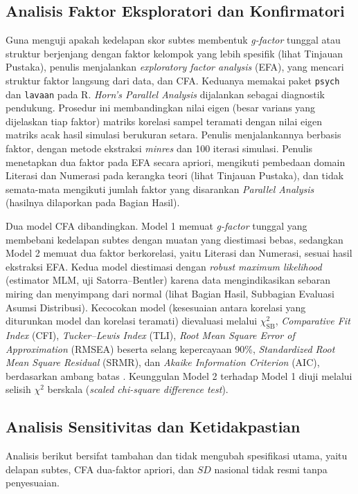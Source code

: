 \subsection{Analisis Faktor Eksploratori dan Konfirmatori}
Guna menguji apakah kedelapan skor subtes membentuk \textit{g-factor} tunggal atau struktur berjenjang dengan faktor kelompok yang lebih spesifik (lihat Tinjauan Pustaka), penulis menjalankan \textit{exploratory factor analysis} (EFA), yang mencari struktur faktor langsung dari data, dan CFA. Keduanya memakai paket \texttt{psych} \autocite{revelle2024psych} dan \texttt{lavaan} \autocite{rosseel2012lavaan} pada R. \textit{Horn's Parallel Analysis} \autocite{horn1965} dijalankan sebagai diagnostik pendukung. Prosedur ini membandingkan nilai eigen (besar varians yang dijelaskan tiap faktor) matriks korelasi sampel teramati dengan nilai eigen matriks acak hasil simulasi berukuran setara. Penulis menjalankannya berbasis faktor, dengan metode ekstraksi \textit{minres} dan 100 iterasi simulasi. Penulis menetapkan dua faktor pada EFA secara apriori, mengikuti pembedaan domain Literasi dan Numerasi pada kerangka teori (lihat Tinjauan Pustaka), dan tidak semata-mata mengikuti jumlah faktor yang disarankan \textit{Parallel Analysis} (hasilnya dilaporkan pada Bagian Hasil).

Dua model CFA dibandingkan. Model 1 memuat \textit{g-factor} tunggal yang membebani kedelapan subtes dengan muatan yang diestimasi bebas, sedangkan Model 2 memuat dua faktor berkorelasi, yaitu Literasi dan Numerasi, sesuai hasil ekstraksi EFA. Kedua model diestimasi dengan \textit{robust maximum likelihood} (estimator MLM, uji Satorra--Bentler) karena data mengindikasikan sebaran miring dan menyimpang dari normal (lihat Bagian Hasil, Subbagian Evaluasi Asumsi Distribusi). Kecocokan model (kesesuaian antara korelasi yang diturunkan model dan korelasi teramati) dievaluasi melalui $\chi^2_{\text{SB}}$, \textit{Comparative Fit Index} (CFI), \textit{Tucker--Lewis Index} (TLI), \textit{Root Mean Square Error of Approximation} (RMSEA) beserta selang kepercayaan 90\%, \textit{Standardized Root Mean Square Residual} (SRMR), dan \textit{Akaike Information Criterion} (AIC), berdasarkan ambang batas \textcite{hubentler1999}. Keunggulan Model 2 terhadap Model 1 diuji melalui selisih $\chi^2$ berskala (\textit{scaled chi-square difference test}).

\subsection{Analisis Sensitivitas dan Ketidakpastian}
Analisis berikut bersifat tambahan dan tidak mengubah spesifikasi utama, yaitu delapan subtes, CFA dua-faktor apriori, dan $SD$ nasional tidak resmi tanpa penyesuaian.

